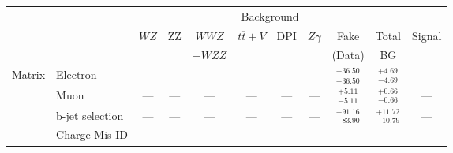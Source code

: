 \small\renewcommand{\tabcolsep}{1pt}
\begin{tabular}{|cl||ccccccc|c||c|}
\hline
 & & \multicolumn{8}{c||}{Background} & \\ 
 & & $WZ$ & ZZ & $WWZ$ & $t\overline{t}+V$ & DPI & $Z\gamma$ & Fake & Total & Signal\\ 
 & & &  & $+WZZ$ &  &  &  & (Data) & BG & \\ 
\hline\hline
\multirow{2}{*}{Matrix}
&Electron & --- & --- & --- & --- & --- & --- &  $^{+36.50}_{-36.50}$  &  $^{+4.69}_{-4.69}$  & ---\\ 
\cline{2-11}
\multirow{2}{*}{Method}
&Muon & --- & --- & --- & --- & --- & --- &  $^{+5.11}_{-5.11}$  &  $^{+0.66}_{-0.66}$  & ---\\ 
\cline{2-11}
&b-jet selection & --- & --- & --- & --- & --- & --- &  $^{+91.16}_{-83.90}$  &  $^{+11.72}_{-10.79}$  & ---\\ 
\hline
&Charge Mis-ID & --- & --- & --- & --- & --- & --- & --- & --- & ---\\ 
\hline
\end{tabular}
